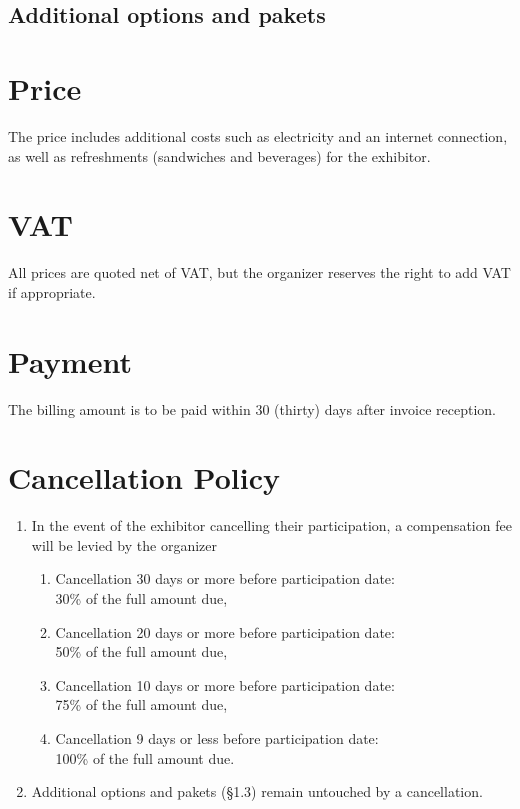 \companydatechoice

\subsection{Additional options and pakets}

\companyextrachoice

\section{Price}

The price includes additional costs such as electricity and an internet connection, as
well as refreshments (sandwiches and beverages) for the exhibitor.

\section{VAT}

All prices are quoted net of VAT, but the organizer reserves the right to add VAT if appropriate.

\section{Payment}

The billing amount is to be paid within 30 (thirty) days after invoice reception.

\section{Cancellation Policy}
\begin{enumerate}
	\item In the event of the exhibitor cancelling their participation, a compensation fee will be levied by the organizer
	\begin{enumerate}
		\item Cancellation 30 days or more before participation date:\\
			30\% of the full amount due,
		\item Cancellation 20 days or more before participation date:\\
			50\% of the full amount due,
		\item Cancellation 10 days or more before participation date:\\
			75\% of the full amount due,
		\item Cancellation 9 days or less before participation date:\\
			100\% of the full amount due.
	\end{enumerate}

	\item Additional options and pakets (\S 1.3) remain untouched by a cancellation.
\end{enumerate}

